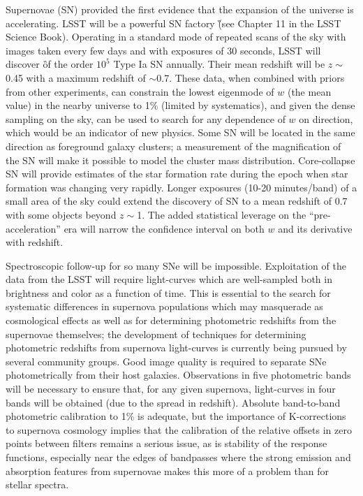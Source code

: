 Supernovae (SN) provided the first evidence that the expansion of the
universe is accelerating. LSST will be a powerful SN factory
\G{(see Chapter 11 in the LSST Science Book)}. Operating in
a standard mode of repeated scans of the sky with images taken every few
days and with exposures of 30 seconds, LSST will discover
\G{of the order $10^5$} Type Ia
SN annually. Their mean redshift will be $z\sim$0.45 with a maximum
redshift of $\sim$0.7. These data, when combined with priors from other
experiments, can constrain the lowest eigenmode of $w$ (\ie the mean
value) in the nearby universe to 1\% (limited by systematics),
and given the dense sampling on
the sky, can be used to search for any dependence of $w$ on direction,
which would be an indicator of new physics.  Some SN will be located in the
same direction as foreground galaxy clusters; a measurement of the
magnification of the SN will make it possible to model the cluster mass
distribution. Core-collapse SN will provide estimates of the star formation
rate during the epoch when star formation was changing very rapidly.
Longer exposures (10-20 minutes/band) of a small area of the sky could
extend the discovery of SN to a mean redshift of 0.7 with some objects
beyond $z\sim$1.  The added statistical leverage on the
``pre-acceleration'' era will narrow the confidence interval on both $w$
and its derivative with redshift.

Spectroscopic follow-up for so many SNe will be impossible. Exploitation of
the data from the LSST will require light-curves which are well-sampled both
in brightness and color as a function of time. This is essential to the
search for systematic differences in supernova populations which may
masquerade as cosmological effects as well as for determining photometric
redshifts from the supernovae themselves; the development of techniques for
determining photometric redshifts from supernova light-curves is currently
being pursued by several community groups. Good image quality is required
to separate SNe photometrically from their host galaxies. Observations in
five photometric bands will be necessary to ensure that, for any given
supernova, light-curves in four  bands will be obtained (due to the spread in
redshift). Absolute band-to-band photometric calibration to 1\% is adequate, but
the importance of K-corrections to supernova cosmology implies that the
calibration of the relative offsets in zero points between filters remains
a serious issue, as
is stability of the response functions, especially near the edges of
bandpasses where the strong emission and absorption features from supernovae
makes this more of a problem than for stellar spectra.

